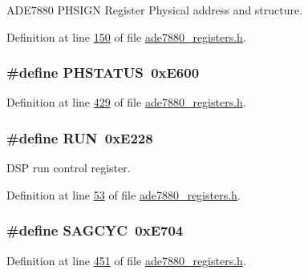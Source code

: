 A\-D\-E7880 P\-H\-S\-I\-G\-N Register Physical address and structure. 



Definition at line \hyperlink{a00036_source_l00150}{150} of file \hyperlink{a00036_source}{ade7880\-\_\-registers.\-h}.

\hypertarget{a00036_a3f530aec5cb9754e76ffadfa165ca107}{
\subsubsection[{P\-H\-S\-T\-A\-T\-U\-S}]{\setlength{\rightskip}{0pt plus 5cm}\#define P\-H\-S\-T\-A\-T\-U\-S~0x\-E600}}\label{de/d8c/a00036_a3f530aec5cb9754e76ffadfa165ca107}


Definition at line \hyperlink{a00036_source_l00429}{429} of file \hyperlink{a00036_source}{ade7880\-\_\-registers.\-h}.

\hypertarget{a00036_a35f69a612b07bbf1de53bbbd8d877c09}{
\subsubsection[{R\-U\-N}]{\setlength{\rightskip}{0pt plus 5cm}\#define R\-U\-N~0x\-E228}}\label{de/d8c/a00036_a35f69a612b07bbf1de53bbbd8d877c09}


D\-S\-P run control register. 



Definition at line \hyperlink{a00036_source_l00053}{53} of file \hyperlink{a00036_source}{ade7880\-\_\-registers.\-h}.

\hypertarget{a00036_aa315ec13f75dbeb156b2222f99cea0f0}{
\subsubsection[{S\-A\-G\-C\-Y\-C}]{\setlength{\rightskip}{0pt plus 5cm}\#define S\-A\-G\-C\-Y\-C~0x\-E704}}\label{de/d8c/a00036_aa315ec13f75dbeb156b2222f99cea0f0}


Definition at line \hyperlink{a00036_source_l00451}{451} of file \hyperlink{a00036_source}{ade7880\-\_\-registers.\-h}.

